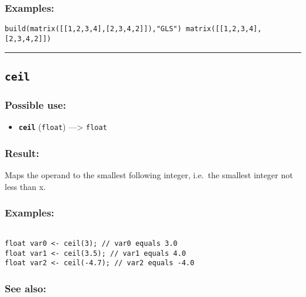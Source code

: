 \documentclass[]{book}
\providecommand{\tightlist}{%
  \setlength{\itemsep}{0pt}\setlength{\parskip}{0pt}}
\theoremstyle{definition}
\theoremstyle{definition}
\theoremstyle{definition}
\theoremstyle{remark}
\begin{document}
\subsubsection{Examples:}\label{examples-61}

\begin{verbatim}
build(matrix([[1,2,3,4],[2,3,4,2]]),"GLS") matrix([[1,2,3,4],[2,3,4,2]]) 
\end{verbatim}

\begin{center}\rule{0.5\linewidth}{\linethickness}\end{center}

\subsection{\texorpdfstring{\texttt{ceil}}{ceil}}\label{ceil}

\subsubsection{Possible use:}\label{possible-use-80}

\begin{itemize}
\tightlist
\item
  \textbf{\texttt{ceil}} (\texttt{float}) ---\textgreater{}
  \texttt{float}
\end{itemize}

\subsubsection{Result:}\label{result-79}

Maps the operand to the smallest following integer, i.e.~the smallest
integer not less than x.

\subsubsection{Examples:}\label{examples-62}

\begin{verbatim}
 
float var0 <- ceil(3); // var0 equals 3.0 
float var1 <- ceil(3.5); // var1 equals 4.0 
float var2 <- ceil(-4.7); // var2 equals -4.0
\end{verbatim}

\subsubsection{See also:}\label{see-also-50}
\end{document}
